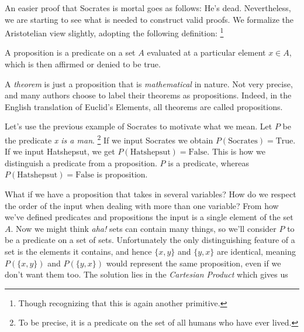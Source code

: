         An easier proof that Socrates is mortal goes as follows: He's dead.
        Nevertheless, we are starting to see what is needed to construct valid
        proofs. We formalize the Aristotelian view slightly, adopting the
        following definition:%
        \footnote{%
            Though recognizing that this is again another primitive.
        }
        \begin{definition}
            \label{def:Proposition}%
            A \gls{proposition} is a \gls{predicate} on a \gls{set} $A$
            evaluated at a particular element $x\in{A}$, which is then affirmed
            or denied to be true.%
        \end{definition}
        A \textit{theorem} is just a
        proposition that is \textit{mathematical} in nature. Not very precise,
        and many authors choose to label their theorems as propositions.
        Indeed, in the English translation of Euclid's Elements, all theorems
        are called propositions.
        \begin{example}
            Let's use the previous example of Socrates to motivate what we mean.
            Let $P$ be the predicate \textit{x is a man}.%
            \footnote{%
                To be precise, it is a predicate on the set of all humans who
                have ever lived.
            }
            If we input Socrates we obtain $P(\text{Socrates})=\text{True}$. If
            we input Hatshepsut, we get $P(\text{Hatshepsut})=\text{False}$.
            This is how we distinguish a predicate from a proposition. $P$ is
            a predicate, whereas $P(\text{Hatshepsut})=\text{False}$ is
            proposition.
        \end{example}
        What if we have a proposition that takes in several variables? How do we
        respect the order of the input when dealing with more than one variable?
        From how we've defined predicates and propositions the input
        is a single element of the set $A$. Now we might think \textit{aha!}
        sets can contain many things, so we'll consider $P$ to be a predicate on
        a set of sets. Unfortunately the only distinguishing feature of a set
        is the elements it contains, and hence $\{x,y\}$ and $\{y,x\}$ are
        identical, meaning $P(\{x,y\})$ and $P(\{y,x\})$ would represent the
        same proposition, even if we don't want them too. The solution lies in
        the \textit{Cartesian Product} which gives us
